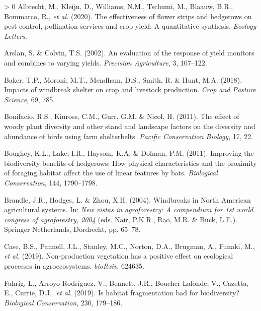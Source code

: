\documentclass[]{elsarticle} %
\newlength{\cslhangindent}
\newenvironment{CSLReferences}[3] %
 {%
  \setlength{\parindent}{0pt}
  \ifodd #1 \everypar{\setlength{\hangindent}{\cslhangindent}}\ignorespaces\fi
  \ifnum #2 > 0
  \setlength{\parskip}{#2\baselineskip}
  \fi
 }%
 {}
\begin{document}
\hypertarget{refs}{}
\begin{CSLReferences}{1}{0}
\leavevmode\hypertarget{ref-albrecht2020}{}%
Albrecht, M., Kleijn, D., Williams, N.M., Tschumi, M., Blaauw, B.R., Bommarco, R., \emph{et al.} (2020). The effectiveness of flower strips and hedgerows on pest control, pollination services and crop yield: A quantitative synthesis. \emph{Ecology Letters}.

\leavevmode\hypertarget{ref-arslan2002}{}%
Arslan, S. \& Colvin, T.S. (2002). An evaluation of the response of yield monitors and combines to varying yields. \emph{Precision Agriculture}, 3, 107--122.

\leavevmode\hypertarget{ref-baker2018}{}%
Baker, T.P., Moroni, M.T., Mendham, D.S., Smith, R. \& Hunt, M.A. (2018). Impacts of windbreak shelter on crop and livestock production. \emph{Crop and Pasture Science}, 69, 785.

\leavevmode\hypertarget{ref-bonifacio2011}{}%
Bonifacio, R.S., Kinross, C.M., Gurr, G.M. \& Nicol, H. (2011). The effect of woody plant diversity and other stand and landscape factors on the diversity and abundance of birds using farm shelterbelts. \emph{Pacific Conservation Biology}, 17, 22.

\leavevmode\hypertarget{ref-boughey2011}{}%
Boughey, K.L., Lake, I.R., Haysom, K.A. \& Dolman, P.M. (2011). Improving the biodiversity benefits of hedgerows: How physical characteristics and the proximity of foraging habitat affect the use of linear features by bats. \emph{Biological Conservation}, 144, 1790--1798.

\leavevmode\hypertarget{ref-brandle2004}{}%
Brandle, J.R., Hodges, L. \& Zhou, X.H. (2004). Windbreaks in {North American} agricultural systems. In: \emph{New vistas in agroforestry: A compendium for 1st world congress of agroforestry, 2004} (eds. Nair, P.K.R., Rao, M.R. \& Buck, L.E.). Springer Netherlands, Dordrecht, pp. 65--78.

\leavevmode\hypertarget{ref-case2019}{}%
Case, B.S., Pannell, J.L., Stanley, M.C., Norton, D.A., Brugman, A., Funaki, M., \emph{et al.} (2019). Non-production vegetation has a positive effect on ecological processes in agroecosystems. \emph{bioRxiv}, 624635.

\leavevmode\hypertarget{ref-fahrig2019}{}%
Fahrig, L., Arroyo-Rodríguez, V., Bennett, J.R., Boucher-Lalonde, V., Cazetta, E., Currie, D.J., \emph{et al.} (2019). Is habitat fragmentation bad for biodiversity? \emph{Biological Conservation}, 230, 179--186.


\end{CSLReferences}
\end{document}
